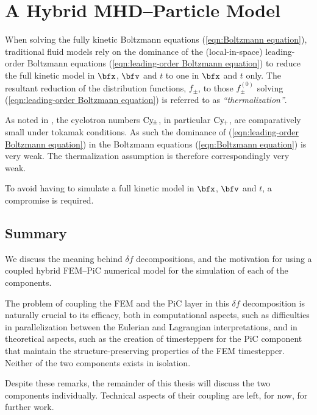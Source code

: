 \chapter{A Hybrid MHD--Particle Model}\label{cha:delta f corrections}
    When solving the fully kinetic Boltzmann equations (\ref{eqn:Boltzmann equation}), traditional fluid models rely on the dominance of the (local-in-space) leading-order Boltzmann equations (\ref{eqn:leading-order Boltzmann equation}) to reduce the full kinetic model in $\bfx$, $\bfv$ and $t$ to one in $\bfx$ and $t$ only. The resultant reduction of the distribution functions, $f_{\pm}$, to those $f_{\pm}^{(0)}$ solving (\ref{eqn:leading-order Boltzmann equation}) is referred to as \emph{``thermalization''}.
    
    As noted in \cite{addendum}, the cyclotron numbers $\mathrm{Cy}\!_{\pm}$, in particular $\mathrm{Cy}\!_{+}$, are comparatively small under tokamak conditions. As such the dominance of (\ref{eqn:leading-order Boltzmann equation}) in the Boltzmann equations (\ref{eqn:Boltzmann equation}) is very weak. The thermalization assumption is therefore correspondingly very weak.

    To avoid having to simulate a full kinetic model in $\bfx$, $\bfv$ and $t$, a compromise is required.


    
    
    
    


    \section*{Summary}
        We discuss the meaning behind $\delta\!f$ decompositions, and the motivation for using a coupled hybrid FEM--PiC numerical model for the simulation of each of the components.
        
        The problem of coupling the FEM and the PiC layer in this $\delta\!f$ decomposition is naturally crucial to its efficacy, both in computational aspects, such as difficulties in parallelization between the Eulerian and Lagrangian interpretations, and in theoretical aspects, such as the creation of timesteppers for the PiC component that maintain the structure-preserving properties of the FEM timestepper. Neither of the two components exists in isolation.
        
        \begin{remark}
            Despite these remarks, the remainder of this thesis will discuss the two components individually. Technical aspects of their coupling are left, for now, for further work.
        \end{remark}
    